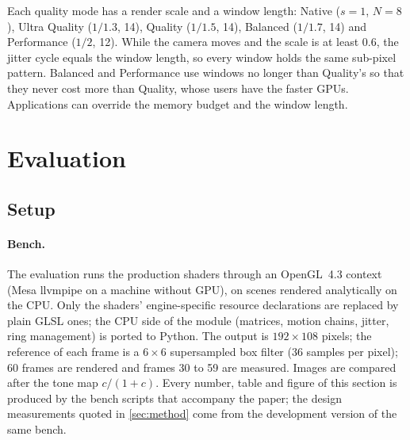 \documentclass[11pt,a4paper]{article}
\begin{document}
Each quality mode has a render scale and a window length: Native ($s=1$, $N=8$), Ultra Quality ($1/1.3$, 14), Quality ($1/1.5$, 14), Balanced ($1/1.7$, 14) and Performance ($1/2$, 12). While the camera moves and the scale is at least 0.6, the jitter cycle equals the window length, so every window holds the same sub-pixel pattern. Balanced and Performance use windows no longer than Quality's so that they never cost more than Quality, whose users have the faster GPUs. Applications can override the memory budget and the window length.

\section{Evaluation}
\label{sec:evaluation}

\subsection{Setup}

\paragraph{Bench.} The evaluation runs the production shaders through an OpenGL~4.3 context (Mesa llvmpipe on a machine without GPU), on scenes rendered analytically on the CPU. Only the shaders' engine-specific resource declarations are replaced by plain GLSL ones; the CPU side of the module (matrices, motion chains, jitter, ring management) is ported to Python. The output is $192\times108$ pixels; the reference of each frame is a $6\times6$ supersampled box filter (36 samples per pixel); 60 frames are rendered and frames 30 to 59 are measured. Images are compared after the tone map $c/(1+c)$. Every number, table and figure of this section is produced by the bench scripts that accompany the paper; the design measurements quoted in \cref{sec:method} come from the development version of the same bench.
\end{document}
